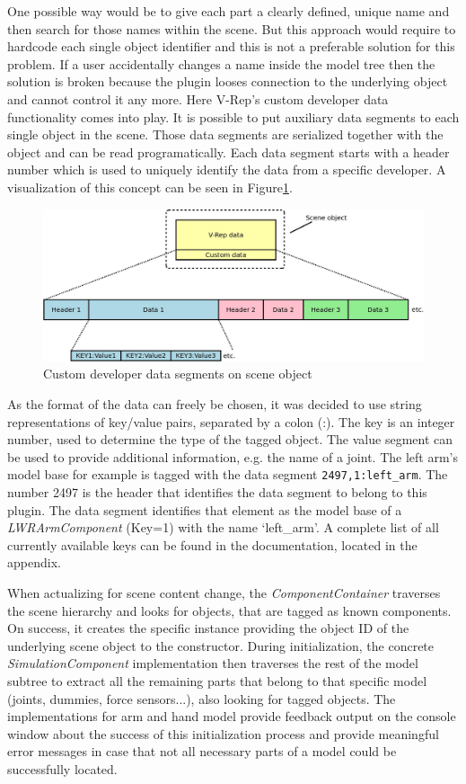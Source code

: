 One possible way would be to give each part a clearly defined, unique name and then search for those names within the scene. But this approach would require to hardcode each single object identifier and this is not a preferable solution for this problem. If a user accidentally changes a name inside the model tree then the solution is broken because the plugin looses connection to the underlying object and cannot control it any more. Here V-Rep's custom developer data functionality comes into play. It is possible to put auxiliary data segments to each single object in the scene. Those data segments are serialized together with the object and can be read programatically. Each data segment starts with a header number which is used to uniquely identify the data from a specific developer. A visualization of this concept can be seen in Figure\ref{fig:cust_dev_data}. 
\begin{figure}[h]
	\centering
  	\includegraphics[width=1.0\textwidth]{images/custom_dev_data.jpg}
	\caption{Custom developer data segments on scene object}
	\label{fig:cust_dev_data}
\end{figure}

As the format of the data can freely be chosen, it was decided to use string representations of key/value pairs, separated by a colon (:). The key is an integer number, used to determine the type of the tagged object. The value segment can be used to provide additional information, e.g. the name of a joint. The left arm's model base for example is tagged with the data segment \texttt{2497,1:left\_arm}. The number 2497 is the header that identifies the data segment to belong to this plugin. The data segment identifies that element as the model base of a \emph{LWRArmComponent} (Key=1) with the name `left\_arm'. A complete list of all currently available keys can be found in the documentation, located in the appendix. 

When actualizing for scene content change, the \emph{ComponentContainer} traverses the scene hierarchy and looks for objects, that are tagged as known components. On success, it creates the specific instance providing the object ID of the underlying scene object to the constructor. During initialization, the concrete \emph{SimulationComponent} implementation then traverses the rest of the model subtree to extract all the remaining parts that belong to that specific model (joints, dummies, force sensors...), also looking for tagged objects. The implementations for arm and hand model provide feedback output on the console window about the success of this initialization process and provide meaningful error messages in case that not all necessary parts of a model could be successfully located.

